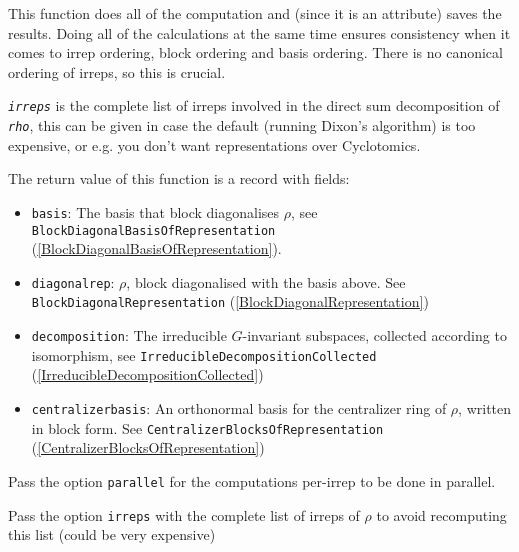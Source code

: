 \documentclass[a4paper,11pt]{report}
\begin{document}
{{{ This function does all of the computation and (since it is an attribute) saves
the results. Doing all of the calculations at the same time ensures
consistency when it comes to irrep ordering, block ordering and basis
ordering. There is no canonical ordering of irreps, so this is crucial. 

 \mbox{\texttt{\mdseries\slshape irreps}} is the complete list of irreps involved in the direct sum decomposition of \mbox{\texttt{\mdseries\slshape rho}}, this can be given in case the default (running Dixon's algorithm) is too
expensive, or e.g. you don't want representations over Cyclotomics. 

 The return value of this function is a record with fields: 

 
\begin{itemize}
\item  \texttt{basis}: The basis that block diagonalises $\rho$, see \texttt{BlockDiagonalBasisOfRepresentation} (\ref{BlockDiagonalBasisOfRepresentation}). 
\end{itemize}
 

 
\begin{itemize}
\item  \texttt{diagonal{\textunderscore}rep}: $\rho$, block diagonalised with the basis above. See \texttt{BlockDiagonalRepresentation} (\ref{BlockDiagonalRepresentation}) 
\end{itemize}
 

 
\begin{itemize}
\item  \texttt{decomposition}: The irreducible $G$-invariant subspaces, collected according to isomorphism, see \texttt{IrreducibleDecompositionCollected} (\ref{IrreducibleDecompositionCollected}) 
\end{itemize}
 

 
\begin{itemize}
\item  \texttt{centralizer{\textunderscore}basis}: An orthonormal basis for the centralizer ring of $\rho$, written in block form. See \texttt{CentralizerBlocksOfRepresentation} (\ref{CentralizerBlocksOfRepresentation}) 
\end{itemize}
 

 Pass the option \texttt{parallel} for the computations per-irrep to be done in parallel. 

 Pass the option \texttt{irreps} with the complete list of irreps of $\rho$ to avoid recomputing this list (could be very expensive) }

 }

 }
\end{document}
